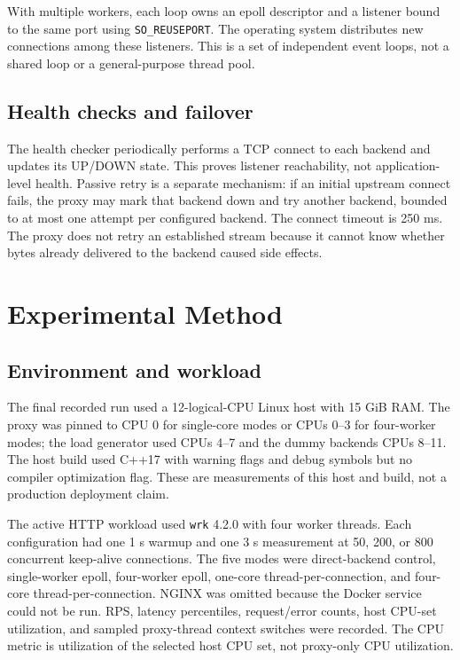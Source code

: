 \documentclass[conference]{IEEEtran}
\begin{document}
With multiple workers, each loop owns an epoll descriptor and a listener bound to the same port using \texttt{SO\_REUSEPORT}. The operating system distributes new connections among these listeners. This is a set of independent event loops, not a shared loop or a general-purpose thread pool.

\subsection{Health checks and failover}
The health checker periodically performs a TCP connect to each backend and updates its UP/DOWN state. This proves listener reachability, not application-level health. Passive retry is a separate mechanism: if an initial upstream connect fails, the proxy may mark that backend down and try another backend, bounded to at most one attempt per configured backend. The connect timeout is 250 ms. The proxy does not retry an established stream because it cannot know whether bytes already delivered to the backend caused side effects.

\section{Experimental Method}
\subsection{Environment and workload}
The final recorded run used a 12-logical-CPU Linux host with 15 GiB RAM. The proxy was pinned to CPU 0 for single-core modes or CPUs 0--3 for four-worker modes; the load generator used CPUs 4--7 and the dummy backends CPUs 8--11. The host build used C++17 with warning flags and debug symbols but no compiler optimization flag. These are measurements of this host and build, not a production deployment claim.

The active HTTP workload used \texttt{wrk} 4.2.0 with four worker threads. Each configuration had one 1 s warmup and one 3 s measurement at 50, 200, or 800 concurrent keep-alive connections. The five modes were direct-backend control, single-worker epoll, four-worker epoll, one-core thread-per-connection, and four-core thread-per-connection. NGINX was omitted because the Docker service could not be run. RPS, latency percentiles, request/error counts, host CPU-set utilization, and sampled proxy-thread context switches were recorded. The CPU metric is utilization of the selected host CPU set, not proxy-only CPU utilization.
\end{document}
